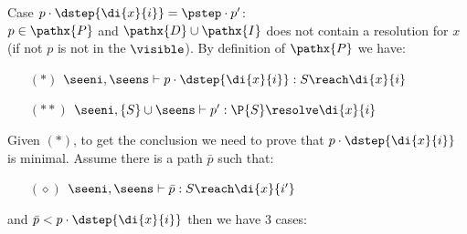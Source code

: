 \noindent Case $p \cdot \dstep{\di{x}{i}} = \pstep\cdot p'$:\\ 
$p \in \pathx{P}$ and $\pathx{D} \cup \pathx{I}$ does not contain a resolution for $x$ (if not $p$ is not in the $\visible$).
By definition of $\pathx{P}$ we have:
\begin{itemize}[leftmargin=15mm]
 \item[$(*)$] $ \seeni,\seens \vdash p\cdot \dstep{\di{x}{i}} : S \reach \di{x}{i}$
 \item[$(**)$] $ \seeni,\{S\} \cup \seens \vdash p' : \P{S} \resolve \di{x}{i}$
\end{itemize}
Given $(*)$, to get the conclusion we need to prove that $p\cdot \dstep{\di{x}{i}}$ is minimal. Assume there is a path $\bar{p}$ such that:
\begin{itemize}[leftmargin=15mm]
 \item[$(\diamond)$] $ \seeni,\seens \vdash \bar{p} : S \reach \di{x}{i'}$
\end{itemize}
and $\bar{p} < p\cdot \dstep{\di{x}{i}}$ then we have 3 cases:
